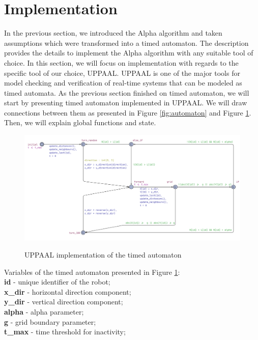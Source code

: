 \section{Implementation}
In the previous section, we introduced the Alpha algorithm and taken assumptions which were transformed into a timed automaton. The description provides the details to implement the Alpha algorithm with any suitable tool of choice. In this section, we will focus on implementation with regards to the specific tool of our choice, UPPAAL. UPPAAL is one of the major tools for model checking and verification of real-time systems that can be modeled as timed automata. As the previous section finished on timed automaton, we will start by presenting timed automaton implemented in UPPAAL. We will draw connections between them as presented in Figure \ref{fig:automaton} and Figure \ref{fig:automaton_uppaal}. Then, we will explain global functions and state.

\begin{figure}[H]
\caption{UPPAAL implementation of the timed automaton}
\includegraphics[width=\textwidth]{images/automaton_uppaal.png}
\label{fig:automaton_uppaal}
\end{figure}

\noindent
Variables of the timed automaton presented in Figure \ref{fig:automaton_uppaal}:\\
\textbf{id} - unique identifier of the robot;\\
\textbf{x\_dir} - horizontal direction component;\\
\textbf{y\_dir} - vertical direction component;\\
\textbf{alpha} - alpha parameter;\\
\textbf{g} - grid boundary parameter;\\
\textbf{t\_max} - time threshold for inactivity;\\

